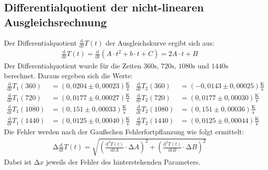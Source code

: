 \subsection{Differentialquotient der nicht-linearen Ausgleichsrechnung}
Der Differentialquotient $\frac{\mathup{d}}{\mathup{d}t} T(t)$ der Ausgleichskurve ergibt sich aus:
\begin{align*}
  \frac{\mathup{d}}{\mathup{d}t} T(t) = \frac{\mathup{d}}{\mathup{d}t}(A\cdot t^2 + b\cdot t + C) = 2 A\cdot t + B
\end{align*}
Der Differentialquotient wurde für die Zeiten $360 \si{\second}$, $720 \si{\second}$, $1080 \si{\second}$ und $1440 \si{\second}$ berechnet.
Daraus ergeben sich die Werte:
\begin{align*}
  \frac{\mathup{d}}{\mathup{d}t} T_1(360) &= (0,0204 \pm 0,00023) \frac{\si{\kelvin}}{\si{\second}} &
  \frac{\mathup{d}}{\mathup{d}t} T_2(360) &= (-0,0143 \pm 0,00025) \frac{\si{\kelvin}}{\si{\second}} \\
  \frac{\mathup{d}}{\mathup{d}t} T_1(720) &= (0,0177 \pm 0,00027) \frac{\si{\kelvin}}{\si{\second}} &
  \frac{\mathup{d}}{\mathup{d}t} T_2(720) &= (0,0177 \pm 0,00030) \frac{\si{\kelvin}}{\si{\second}} \\
  \frac{\mathup{d}}{\mathup{d}t} T_1(1080) &= (0,151 \pm 0,00033) \frac{\si{\kelvin}}{\si{\second}} &
  \frac{\mathup{d}}{\mathup{d}t} T_2(1080) &= (0,151 \pm 0,00036) \frac{\si{\kelvin}}{\si{\second}} \\
  \frac{\mathup{d}}{\mathup{d}t} T_1(1440) &= (0,0125 \pm 0,00040) \frac{\si{\kelvin}}{\si{\second}} &
  \frac{\mathup{d}}{\mathup{d}t} T_2(1440) &= (0,0125 \pm 0,00044) \frac{\si{\kelvin}}{\si{\second}}
\end{align*}
Die Fehler werden nach der Gaußschen Fehlerfortpflanzung wie folgt ermittelt:
\begin{align*}
  \increment\frac{\mathup{d}}{\mathup{d}t} T(t) = \sqrt{\left(\frac{\mathup{d^2}T(t)}{\mathup{d}tA}\cdot\increment A\right)^2 + \left(\frac{\mathup{d^2}T(t)}{\mathup{d}tB}\cdot\increment B\right)^2}
\end{align*}
Dabei ist $\increment x$ jeweils der Fehler des hinterstehenden Parameters.
